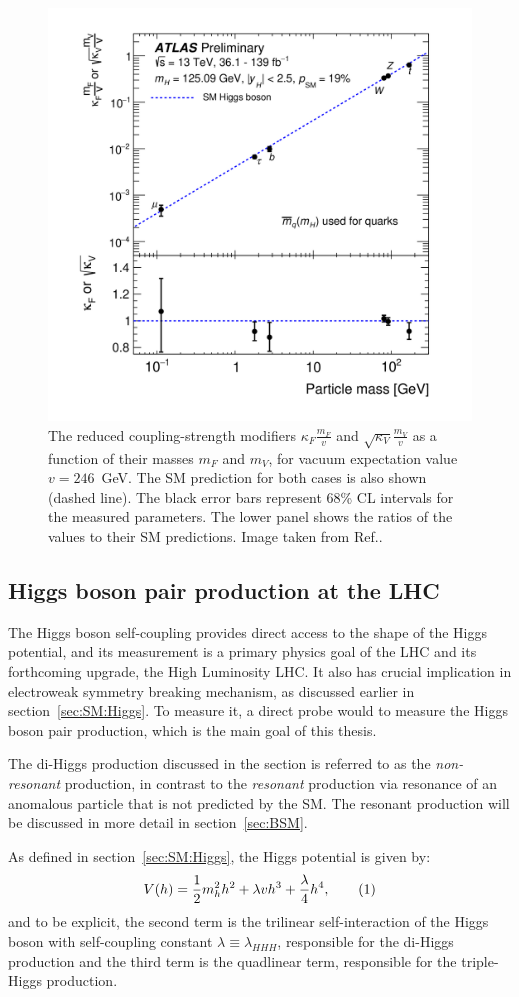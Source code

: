 \begin{figure}[htbp]
\centering
\includegraphics[width=.61\textwidth]{theory/plots/coupling.png}
\caption{The reduced coupling-strength modifiers $\kappa_F \frac{m_F}{v}$
and  $\sqrt{\kappa_V}\frac{m_V}{v}$ as a function of their masses
$m_F$ and $m_V$, for vacuum expectation value $v=246$~GeV.
The SM prediction for both cases is also shown (dashed line). 
The black error bars represent 68\% CL intervals for the measured parameters. 
The lower panel shows the ratios of the values to their SM predictions.
Image taken from Ref.\cite{ATLAS-CONF-2021-053}.}
    \label{fig:SM:couplings}
\end{figure}


\subsection{Higgs boson pair production at the LHC}
\label{sec:SM:dihiggs}
The Higgs boson self-coupling provides 
direct access to the shape of the Higgs potential, and its measurement 
is a primary physics goal of the LHC and its forthcoming upgrade, the High Luminosity LHC.
It also has crucial implication in electroweak symmetry breaking mechanism, 
as discussed earlier in section~\ref{sec:SM:Higgs}.
To measure it, a direct probe would to measure the Higgs boson pair production,
which is the main goal of this thesis. 

The di-Higgs production discussed in the section
is referred to as the \textit{non-resonant} production, in contrast to the \textit{resonant}
production via resonance of an anomalous particle that is not predicted by the SM.
The resonant production will be discussed
in more detail in section~\ref{sec:BSM}.

As defined in section~\ref{sec:SM:Higgs}, the Higgs potential is given by:
\[
V(h) =  \frac{1}{2} m_h^2 h^2 + \lambda v h^3 + \frac{\lambda}{4} h^4,
\addtag \]
and to be explicit, the second term is the trilinear self-interaction of the Higgs boson
with self-coupling constant $\lambda\equiv \lambda_{HHH}$,
responsible for the di-Higgs production and the 
third term is the quadlinear term, responsible for the triple-Higgs production. 

